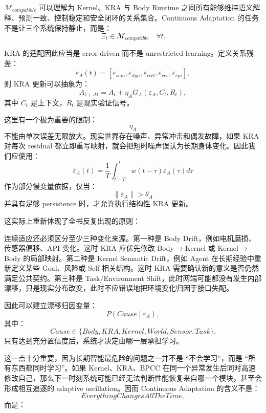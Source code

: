 $\mathcal M_{compatible}$ 可以理解为 Kernel、KRA 与 Body Runtime 之间所有能够维持语义解释、预测一致、控制稳定和安全闭环的关系集合。Continuous Adaptation 的任务不是让三个系统保持静止，而是：
\[
\boxed{
\Xi_t
\in
\mathcal M_{compatible}
\quad
\forall t.
}
\]

KRA 的适配因此应当是 error-driven 而不是 unrestricted learning。定义关系残差：
\[
\varepsilon_A(t)
=
[
\varepsilon_{sem},
\varepsilon_{dyn},
\varepsilon_{ctrl},
\varepsilon_{res},
\varepsilon_{epi}
],
\]
则 KRA 更新可以抽象为：
\[
A_{t+\Delta t}
=
A_t
+
\eta_A
G_A(
\varepsilon_A,
C_t,
R_t
),
\]
其中 $C_t$ 是上下文，$R_t$ 是现实验证信号。

这里有一个极为重要的限制：
\[
\eta_A
\]
不能由单次误差无限放大。现实世界存在噪声、异常冲击和偶发故障，如果 KRA 对每次 residual 都立即重写映射，就会把短时噪声误认为长期身体变化。因此我们应使用：
\[
\bar\varepsilon_A(t)
=
\frac{1}{T}
\int_{t-T}^{t}
w(t-\tau)\varepsilon_A(\tau)d\tau
\]
作为部分慢变量依据，仅当：
\[
\|\bar\varepsilon_A\|>\theta_A
\]
并具有足够 persistence 时，才允许执行结构性 KRA 更新。

这实际上重新体现了全书反复出现的原则：
\begin{statementbox}
\centering
{}
\end{statementbox}

连续适应还必须区分至少三种变化来源。第一种是 Body Drift，例如电机磨损、传感器偏移、API 变化。这时 KRA 应优先修改 Body$\rightarrow$Kernel 或 Kernel$\rightarrow$Body 的局部映射。第二种是 Kernel Semantic Drift，例如 Agent 在长期经验中重新定义某些 Goal、风险或 Self 相关结构。这时 KRA 需要确认新的意义是否仍然满足公共契约。第三种是 Task/Environment Shift，此时两端可能都没有发生内部漂移，只是现实分布改变，此时不应错误地把环境变化归因于接口失配。

因此可以建立漂移归因变量：
\[
P(
Cause
\mid
\varepsilon_A
),
\]
其中：
\[
Cause
\in
\{
Body,
KRA,
Kernel,
World,
Sensor,
Task
\}.
\]
只有达到充分置信度后，系统才决定由哪一层承担学习。

这一点十分重要，因为长期智能最危险的问题之一并不是 ``不会学习''，而是 ``所有东西都同时学习''。如果 Kernel、KRA、BPCC 在同一个异常发生后同时高速修改自己，那么下一时刻系统可能已经无法判断性能恢复来自哪一个模块，甚至会形成相互追逐的 adaptive oscillation。因而 Continuous Adaptation 的含义不是：
\[
EverythingChangesAllTheTime,
\]
而是：
\begin{statementbox}
\centering
{}
\end{statementbox}

